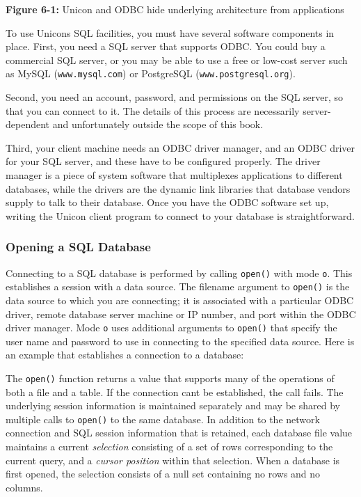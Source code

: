 {\sffamily\bfseries Figure 6-1:}
{\sffamily Unicon and ODBC hide underlying architecture from
 applications}

\bigskip

To use Unicon{\textquotesingle}s SQL facilities, you must have several
software components in place. First, you need a SQL server that
supports ODBC. You could buy a commercial SQL server, or you may be
able to use a free or low-cost server such as MySQL
(\texttt{www.mysql.com}) or PostgreSQL
(\texttt{www.postgresql.org}).

Second, you need an account, password, and permissions on the SQL
server, so that you can connect to it. The details of this process are
necessarily server-dependent and unfortunately outside the scope of
this book.

Third, your client machine needs an ODBC
driver manager, and an ODBC driver for your SQL server, and these have
to be configured properly. The driver manager is a piece of system
software that multiplexes applications to different databases, while
the drivers are the dynamic link libraries that database vendors supply
to talk to their database. Once you have the ODBC software set up,
writing the Unicon client program to connect to your database is
straightforward.

\subsubsection[Opening a SQL Database]{Opening a SQL Database}
Connecting to a SQL database is performed by calling \texttt{open()}
with mode \texttt{{\textquotedbl}o{\textquotedbl}}. This establishes a
session with a data source. The filename argument to \texttt{open()} is
the data source to which you are connecting; it is associated with a
particular ODBC driver, remote database server machine or IP number,
and port within the ODBC driver manager. Mode
\texttt{{\textquotedbl}o{\textquotedbl}} uses additional arguments to
\texttt{open()} that specify the user name and password to use in
connecting to the specified data source. Here is an example that
establishes a connection to a database:


The \texttt{open()} function returns a value that supports many of the
operations of both a file and a table. If the connection
can{\textquotesingle}t be established, the call fails. The underlying
session information is maintained separately and may be shared by
multiple calls to \texttt{open()} to the same database. In addition to
the network connection and SQL session information that is retained,
each database file value maintains a current \textit{selection}
consisting of a set of rows corresponding to the current query, and a
\textit{cursor position} within that selection. When a database is
first opened, the selection consists of a null set containing no rows
and no columns.

